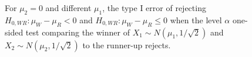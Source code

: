 \documentclass{article}
\begin{document}
\begin{figure}[]
    \centering
    \caption{For $\mu_2=0$ and different $\mu_1$, the type I error of rejecting $H_{0, WR}: \mu_W - \mu_R < 0$ and  $H_{0, WR}: \mu_W - \mu_R \leq 0$ when the level $\alpha$ one-sided test comparing the winner of $X_1 \sim N(\mu_1, 1/\sqrt{2})$ and $X_2 \sim N(\mu_2, 1/\sqrt{2})$  to the runner-up rejects.}
    \label{fig:warm_up_error_control}
\end{figure}
\end{document}
